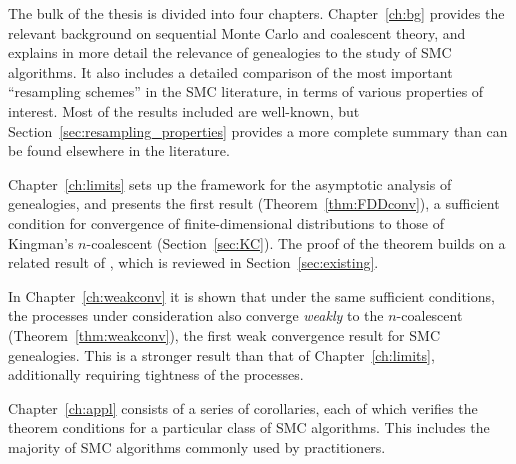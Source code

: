 The bulk of the thesis is divided into four chapters. 
Chapter~\ref{ch:bg} provides the relevant background on sequential Monte Carlo and coalescent theory, and explains in more detail the relevance of genealogies to the study of SMC algorithms.
It also includes a detailed comparison of the most important ``resampling schemes'' in the SMC literature, in terms of various properties of interest. Most of the results included are well-known, but Section~\ref{sec:resampling_properties} provides a more complete summary than can be found elsewhere in the literature.

Chapter~\ref{ch:limits} sets up the framework for the asymptotic analysis of genealogies, and presents the first result (Theorem~\ref{thm:FDDconv}), a sufficient condition for convergence of finite-dimensional distributions to those of Kingman's $n$-coalescent (Section~\ref{sec:KC}). The proof of the theorem builds on a related result of \textcite{koskela2018}, which is reviewed in Section~\ref{sec:existing}.

In Chapter~\ref{ch:weakconv} it is shown that under the same sufficient conditions, the processes under consideration also converge \emph{weakly} to the $n$-coalescent (Theorem~\ref{thm:weakconv}), the first weak convergence result for SMC genealogies. This is a stronger result than that of Chapter~\ref{ch:limits}, additionally requiring tightness of the processes.

Chapter~\ref{ch:appl} consists of a series of corollaries, each of which verifies the theorem conditions for a particular class of SMC algorithms. This includes the majority of SMC algorithms commonly used by practitioners.

